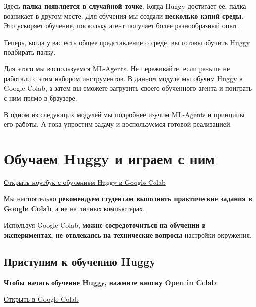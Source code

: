 \documentclass[11pt,a4paper]{article}
\begin{document}
Здесь \textbf{палка появляется в случайной точке}. Когда Huggy достигает её, палка возникает в другом месте. Для обучения мы создали \textbf{несколько копий среды}. Это ускоряет обучение, поскольку агент получает более разнообразный опыт.

Теперь, когда у вас есть общее представление о среде, вы готовы обучить Huggy подбирать палку.

Для этого мы воспользуемся \href{https://github.com/Unity-Technologies/ml-agents}{ML-Agents}. Не переживайте, если раньше не работали с этим набором инструментов. В данном модуле мы обучим Huggy в Google Colab, а затем вы сможете загрузить своего обученного агента и поиграть с ним прямо в браузере.

В одном из следующих модулей мы подробнее изучим ML-Agents и принципы его работы. А пока упростим задачу и воспользуемся готовой реализацией.

\section{Обучаем Huggy и играем с ним}\label{lets-train-and-play-with-huggy}

\href{https://colab.research.google.com/github/huggingface/deep-rl-class/blob/master/notebooks/bonus-unit1/bonus-unit1.ipynb}{Открыть ноутбук с обучением Huggy в Google Colab}

Мы настоятельно \textbf{рекомендуем студентам выполнять практические задания в Google Colab}, а не на личных компьютерах.

Используя Google Colab, \textbf{можно сосредоточиться на обучении и экспериментах, не отвлекаясь на технические вопросы} настройки окружения.

\subsection{Приступим к обучению Huggy}\label{lets-train-huggy}

\textbf{Чтобы начать обучение Huggy, нажмите кнопку Open in Colab}:

\href{https://colab.research.google.com/github/huggingface/deep-rl-class/blob/master/notebooks/bonus-unit1/bonus-unit1.ipynb}{Открыть в Google Colab}

\end{document}
